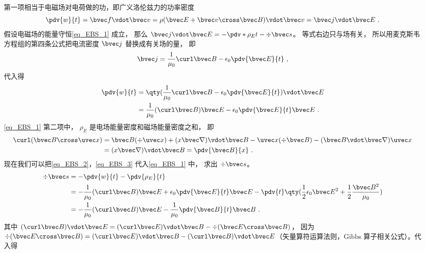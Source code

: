 第一项相当于电磁场对电荷做的功，即广义洛伦兹力的功率密度
\begin{equation}
\pdv{w}{t} = \bvec f \vdot \bvec v = \rho (\bvec E + \bvec v \cross \bvec B) \vdot \bvec v = \bvec j \vdot \bvec E~.
\end{equation} 
假设电磁场的能量守恒\autoref{eq_EBS_1} 成立， 那么 $\bvec j \vdot \bvec E =  - \pdv*{\rho_E}{t} - \div \bvec s$。 等式右边只与场有关， 所以用麦克斯韦方程组的第四条公式把电流密度 $\bvec j$ 替换成有关场的量， 即
\begin{equation}
\bvec j = \frac{1}{\mu_0} \curl \bvec B - \epsilon_0 \pdv{\bvec E}{t}~,
\end{equation} 
代入得
\begin{equation}\label{eq_EBS_2}
\begin{aligned}
\pdv{w}{t} &= \qty(\frac{1}{\mu_0} \curl \bvec B - \epsilon_0 \pdv{\bvec E}{t}) \vdot \bvec E\\
&= \frac{1}{\mu_0} (\curl \bvec B)\bvec E - \epsilon_0 \pdv{\bvec E}{t} \bvec E~.
\end{aligned}
\end{equation} 
\autoref{eq_EBS_1} 第二项中， $\rho_E$ 是电场能量密度和磁场能量密度之和， 即
\begin{equation}\label{eq_EBS_3}
\begin{aligned}
\curl (\bvec B \cross \uvec x) &= \bvec B(\div \uvec x) + (x\bvec\nabla) \vdot\bvec B - \uvec x( \div \bvec B) - (\bvec B\vdot\bvec\nabla)\uvec x \\
&= (x\bvec\nabla)\vdot\bvec B = \pdv{\bvec B}{x}~.
\end{aligned}\end{equation} 
现在我们可以把\autoref{eq_EBS_2}，\autoref{eq_EBS_3} 代入\autoref{eq_EBS_1} 中， 求出 $\div \bvec s$。 
\begin{equation}
\begin{aligned}
\div \bvec s &=  - \pdv{w}{t} - \pdv{\rho_E}{t}\\
&= -\frac{1}{\mu_0} (\curl \bvec B)\bvec E + \epsilon_0 \pdv{\bvec E}{t} \bvec E - \pdv{t} \qty( \frac12 \epsilon_0 \bvec E^2 + \frac12 \frac{\bvec B^2}{\mu_0} )\\
&=  - \frac{1}{\mu_0} (\curl \bvec B)\bvec E - \frac{1}{\mu_0} \pdv{\bvec B}{t}\bvec B~.
\end{aligned}
\end{equation} 
其中 $(\curl \bvec B) \vdot \bvec E = (\curl \bvec E) \vdot \bvec B - \div (\bvec E \cross \bvec B)$， 因为 $\div (\bvec E \cross \bvec B) = (\curl \bvec E) \vdot \bvec B - (\curl \bvec B) \vdot \bvec E$（矢量算符运算法则，Gibbs 算子相关公式）。代入得
